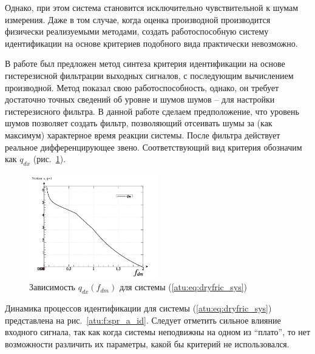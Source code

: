 Однако, при этом система становится исключительно чувствительной
к шумам измерения. Даже в том случае, когда
оценка производной производится физически реализуемыми методами,
создать работоспособную систему идентификации на основе критериев
подобного вида практически невозможно.

В работе \cite{atu_asau11} был предложен метод синтеза критерия идентификации
на основе гистерезисной фильтрации выходных сигналов, с последующим
вычислением производной. Метод показал свою работоспособность, однако,
он требует достаточно точных сведений об уровне и шумов шумов -- для
настройки гистерезисного фильтра. В данной работе сделаем предположение,
что уровень шумов позволяет создать фильтр, позволяющий отсеивать шумы
за (как максимум) характерное время реакции системы.
После фильтра действует реальное дифференцирующее звено.
Соответствующий вид критерия обозначим как $ q_{dx} $ (рис.~\ref{atu:f:fric_q}).



\begin{figure}[htb!]
\centerline{
  \includegraphics[width=0.50\textwidth]{p/cha/fric/fric_p-p_f_dm_q.png}
}
  \caption{Зависимость $q_{dx}(f_{dm})$ для системы (\ref{atu:eq:dryfric_sys}) }
\label{atu:f:fric_q}
\end{figure}


Динамика процессов идентификации для системы (\ref{atu:eq:dryfric_sys}) представлена на рис.~\ref{atu:f:spr_a_id}.
Следует отметить сильное влияние входного сигнала, так как когда системы неподвижны
на одном из ``плато'', то нет возможности различить их параметры,
какой бы критерий не использовался.

